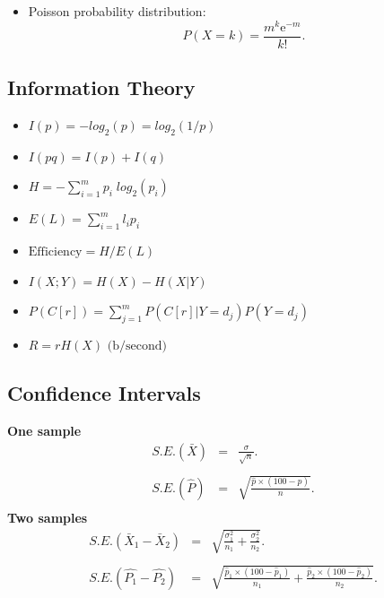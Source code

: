 \documentclass[a4paper,12pt]{article}
\begin{document}
\begin{itemize}
\begin{itemize}
\begin{itemize}
\item Poisson probability distribution:
\begin{equation*}
P(X = k) =\frac{m^{k}\mathrm{e}^{-m}}{k!}.
\end{equation*}
\end{itemize}

\subsection*{Information Theory}

\begin{itemize}
\item $I(p) = - log_{2}(p) = log_{2}(1/p)$\\

\item $I(pq) = I(p) + I(q)$\\

\item $H = - \sum_{i=1}^{m}p_{i}\; log_{2}(p_{i})$\\

\item $E(L) = \sum_{i=1}^{m} l_{i} p_{i}$\\

\item $\mbox{Efficiency} = H / E(L)$\\

\item $I(X;Y) = H(X) - H(X|Y)$\\

\item $P(C[r]) = \sum_{j=1}^{m}P(C[r]|Y=d_{j} )P(Y=d_{j} )$

\item $R = rH(X) \mbox{      (b/second)}$
\end{itemize}

\newpage
\subsection*{Confidence Intervals}
{\bf One sample}
\begin{eqnarray*} S.E.(\bar{X})&=&\frac{\sigma}{\sqrt{n}}.\\\\
S.E.(\hat{P})&=&\sqrt{\frac{\hat{p}\times(100-\hat{p})}{n}}.\\
\end{eqnarray*}
{\bf Two samples}
\begin{eqnarray*}
S.E.(\bar{X}_1-\bar{X}_2)&=&\sqrt{\frac{\sigma^2_1}{n_1}+\frac{\sigma_2^2}{n_2}}.\\\\
S.E.(\hat{P_1}-\hat{P_2})&=&\sqrt{\frac{\hat{p}_1\times(100-\hat{p}_1)}{n_1}+\frac{\hat{p}_2\times(100-\hat{p}_2)}{n_2}}.\\\\
\end{eqnarray*}

\end{itemize}
\end{itemize}
\end{document}
